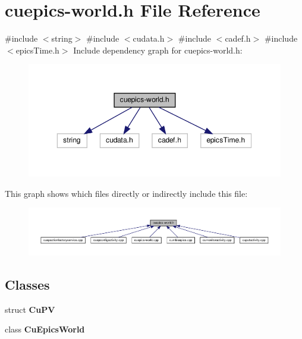 \section{cuepics-\/world.h File Reference}
\label{cuepics-world_8h}
{\ttfamily \#include $<$string$>$}\newline
{\ttfamily \#include $<$cudata.\+h$>$}\newline
{\ttfamily \#include $<$cadef.\+h$>$}\newline
{\ttfamily \#include $<$epics\+Time.\+h$>$}\newline
Include dependency graph for cuepics-\/world.h\+:\nopagebreak
\begin{figure}[H]
\begin{center}
\leavevmode
\includegraphics[width=350pt]{cuepics-world_8h__incl}
\end{center}
\end{figure}
This graph shows which files directly or indirectly include this file\+:\nopagebreak
\begin{figure}[H]
\begin{center}
\leavevmode
\includegraphics[width=350pt]{cuepics-world_8h__dep__incl}
\end{center}
\end{figure}
\subsection*{Classes}
\begin{DoxyCompactItemize}
\item 
struct \textbf{ Cu\+PV}
\item 
class \textbf{ Cu\+Epics\+World}
\end{DoxyCompactItemize}
